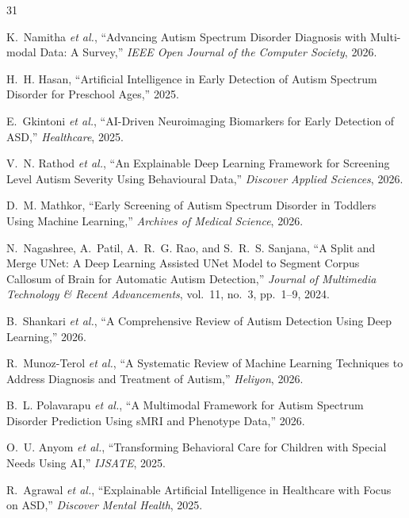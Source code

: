 \documentclass[conference]{IEEEtran}
\begin{document}
\begin{thebibliography}{31}

K.~Namitha \emph{et al.}, ``Advancing Autism Spectrum Disorder Diagnosis with Multi-modal Data: A Survey,'' \emph{IEEE Open Journal of the Computer Society}, 2026.

H.~H. Hasan, ``Artificial Intelligence in Early Detection of Autism Spectrum Disorder for Preschool Ages,'' 2025.

E.~Gkintoni \emph{et al.}, ``AI-Driven Neuroimaging Biomarkers for Early Detection of ASD,'' \emph{Healthcare}, 2025.

V.~N. Rathod \emph{et al.}, ``An Explainable Deep Learning Framework for Screening Level Autism Severity Using Behavioural Data,'' \emph{Discover Applied Sciences}, 2026.

D.~M. Mathkor, ``Early Screening of Autism Spectrum Disorder in Toddlers Using Machine Learning,'' \emph{Archives of Medical Science}, 2026.

N.~Nagashree, A.~Patil, A.~R.~G. Rao, and S.~R.~S. Sanjana, ``A Split and Merge UNet: A Deep Learning Assisted UNet Model to Segment Corpus Callosum of Brain for Automatic Autism Detection,'' \emph{Journal of Multimedia Technology \& Recent Advancements}, vol.~11, no.~3, pp.~1--9, 2024.

B.~Shankari \emph{et al.}, ``A Comprehensive Review of Autism Detection Using Deep Learning,'' 2026.

R.~Munoz-Terol \emph{et al.}, ``A Systematic Review of Machine Learning Techniques to Address Diagnosis and Treatment of Autism,'' \emph{Heliyon}, 2026.

B.~L. Polavarapu \emph{et al.}, ``A Multimodal Framework for Autism Spectrum Disorder Prediction Using sMRI and Phenotype Data,'' 2026.

O.~U. Anyom \emph{et al.}, ``Transforming Behavioral Care for Children with Special Needs Using AI,'' \emph{IJSATE}, 2025.

R.~Agrawal \emph{et al.}, ``Explainable Artificial Intelligence in Healthcare with Focus on ASD,'' \emph{Discover Mental Health}, 2025.


\end{thebibliography}
\end{document}
